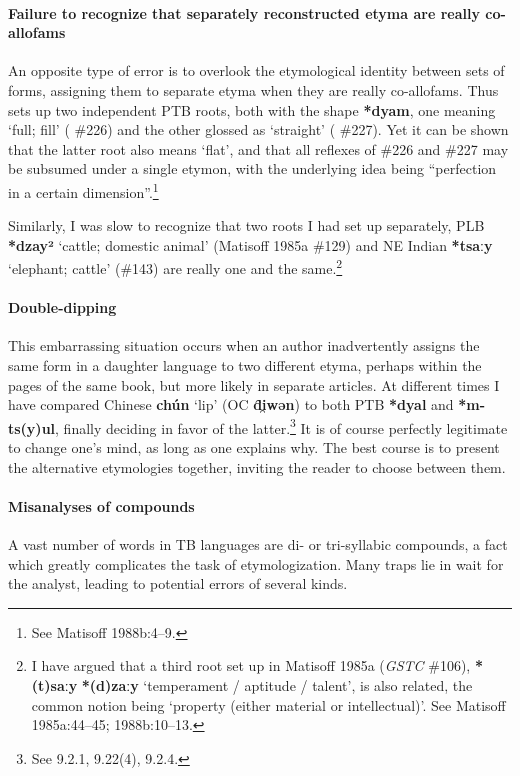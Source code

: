 \paragraph{Failure to recognize that separately reconstructed etyma are really co-allofams}

An opposite type of error is to overlook the etymological identity between sets
of forms, assigning them to separate etyma when they are really co-allofams.
Thus \textit{} sets up two independent PTB roots, both with the shape \textbf{*dyam}, one
meaning ‘full; fill’ (\textit{} \#226) and the other glossed as ‘straight’ (\textit{} \#227).
Yet it can be shown that the latter root also means ‘flat’, and that all
reflexes of \#226 and \#227 may be subsumed under a single etymon, with the
underlying idea being “perfection in a certain dimension”.\footnote{See Matisoff
1988b:4–9.}


Similarly, I was slow to recognize that two roots I had set up separately,
PLB \textbf{*dzay²} ‘cattle; domestic animal’ (Matisoff 1985a \#129)
and NE Indian \textbf{*tsaːy} ‘elephant;
cattle’ (\#143) are really one and the same.\footnote{I have argued that a
third root set up in Matisoff 1985a (\textit{GSTC} \#106), \textbf{*(t)saːy}  \textbf{*(d)zaːy} ‘temperament / aptitude / talent’, is also related, the common notion being ‘property (either material or
intellectual)’. See Matisoff 1985a:44–45; 1988b:10–13.}

\paragraph{Double-dipping}
This embarrassing situation occurs when an author inadvertently assigns the same
form in a daughter language to two different etyma, perhaps within the pages of
the same book, but more likely in separate articles. At different times I have
compared Chinese \textbf{chún}  ‘lip’ (OC \textbf{d̑i̯wən}) to both PTB \textbf{*dyal}
and \textbf{*m-ts(y)ul}, finally deciding in favor of the latter.\footnote{See \textit{}
9.2.1, 9.22(4), 9.2.4.}  It
is of course perfectly legitimate to change one’s mind, as long as one explains
why. The best course is to present the alternative etymologies together,
inviting the reader to choose between them.

\paragraph{Misanalyses of compounds}
A vast number of words in TB languages are di- or tri-syllabic compounds, a fact
which greatly complicates the task of etymologization. Many traps lie in wait
for the analyst, leading to potential errors of several kinds.

